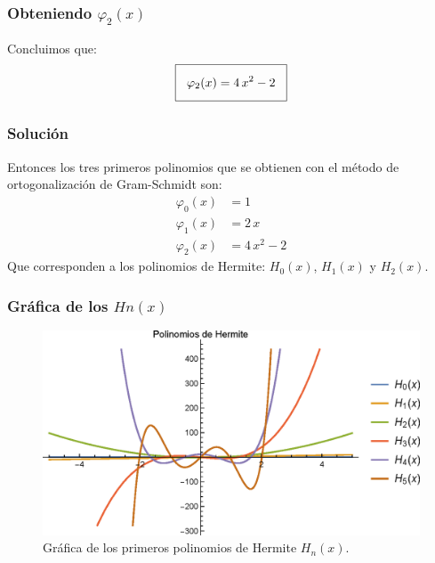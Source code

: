 \begin{frame}
\frametitle{Obteniendo $\varphi_{2}(x)$}
Concluimos que:
\begin{align*}
\setlength{\fboxsep}{3\fboxsep}\boxed{
\varphi_{2} (x) = 4 \, x^{2} - 2 }
\end{align*}
\end{frame}
\begin{frame}
\frametitle{Solución}
Entonces los tres primeros polinomios que se obtienen con el método de ortogonalización de Gram-Schmidt son:
\begin{align*}
\varphi_{0} (x) &= 1 \\[0.5em]
\varphi_{1} (x) &= 2 \, x \\[0.5em]
\varphi_{2} (x) &= 4 \, x^{2} - 2
\end{align*}
Que corresponden a los polinomios de Hermite: $H_{0}(x)$, $H_{1}(x)$ y $H_{2}(x)$.
\end{frame}
\begin{frame}
\frametitle{Gráfica de los $H{n}(x)$}
\begin{figure}[H]
   \centering
   \includegraphics[scale=0.7]{Imagenes/Plot_Hermite.eps}
   \caption{Gráfica de los primeros polinomios de Hermite $H_{n}(x)$.}
\end{figure}
\end{frame}
